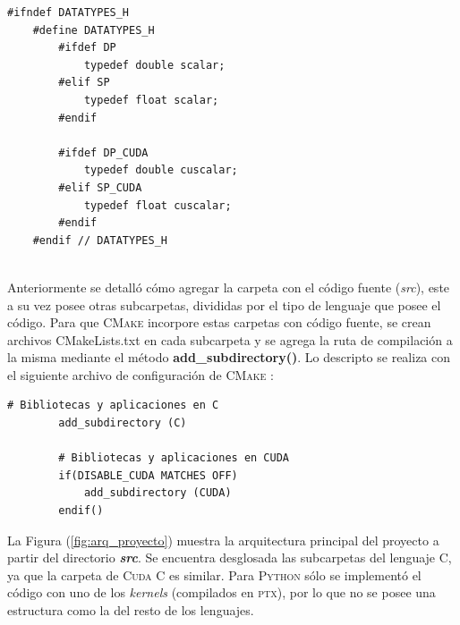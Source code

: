 {\footnotesize
	\begin{frame}{}
		\begin{lstlisting}[frame=single]
	#ifndef DATATYPES_H
	#define DATATYPES_H
		#ifdef DP
			typedef double scalar;
		#elif SP
			typedef float scalar;
		#endif	
		
		#ifdef DP_CUDA
			typedef double cuscalar;
		#elif SP_CUDA
			typedef float cuscalar;
		#endif
	#endif // DATATYPES_H
		
		\end{lstlisting}
		
	\end{frame}
}
\newpage

Anteriormente se detalló cómo agregar la carpeta con el código fuente (\textit{src}), este a su vez posee otras subcarpetas, divididas por el tipo de lenguaje que posee el código. Para que \textsc{CMake} incorpore estas carpetas con código fuente, se crean archivos CMakeLists.txt en cada subcarpeta y se agrega la ruta de compilación a la misma mediante el método \textbf{add\_subdirectory()}. Lo descripto se realiza  con el siguiente archivo de configuración de \textsc{CMake} :

{\footnotesize
	\begin{frame}{}
		\begin{lstlisting}[frame=single]
		# Bibliotecas y aplicaciones en C
		add_subdirectory (C)

		# Bibliotecas y aplicaciones en CUDA
		if(DISABLE_CUDA MATCHES OFF)
			add_subdirectory (CUDA)
		endif()
		\end{lstlisting}
		
	\end{frame}
}

La Figura (\ref{fig:arq_proyecto}) muestra la arquitectura principal del proyecto a partir del directorio \textit{\textbf{src}}. Se encuentra desglosada las subcarpetas del lenguaje \textsc{C}, ya que la carpeta de \textsc{Cuda C} es similar. Para \textsc{Python} sólo se implementó el código con uno de los \textit{kernels} (compilados en \textsc{ptx}), por lo que no se posee una estructura como la del resto de los lenguajes.

